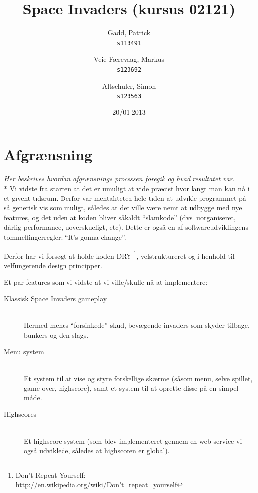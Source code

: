 \documentclass[titlepage,danish]{article}
\begin{document}
\title{Space Invaders (kursus 02121)}
\date{20/01-2013}
\author{
  Gadd, Patrick\\
  \texttt{s113491}
  \and
  Veie Færevaag, Markus\\
  \texttt{s123692}
  \and
  Altschuler, Simon\\
  \texttt{s123563}
}
\maketitle

\section{Afgrænsning}
\emph{Her beskrives hvordan afgrænsnings processen foregik og hvad resultatet var.}\\*
Vi vidste fra starten at det er umuligt at vide præcist hvor langt man kan nå i et givent
tidsrum. Derfor var mentaliteten hele tiden at udvikle programmet på så generisk vis som muligt,
således at det ville være nemt at udbygge med nye features, og det uden at koden bliver såkaldt
``slamkode'' (dvs. uorganiseret, dårlig performance, uoverskueligt, etc). Dette er også en af
softwareudviklingens tommelfingerregler: ``It's gonna change''.

Derfor har vi forsøgt at holde koden DRY \footnote{Don't Repeat Yourself:
  \url{http://en.wikipedia.org/wiki/Don't_repeat_yourself}}, velstruktureret og i henhold til velfungerende design principper.

Et par features som vi vidste at vi ville/skulle nå at implementere:
\begin{description}
  \item[Klassisk Space Invaders gameplay] \hfill \\
    Hermed menes ``forsinkede'' skud, bevægende invaders som skyder tilbage, bunkers og den slags.

  \item[Menu system] \hfill \\
    Et system til at vise og styre forskellige skærme (såsom menu, selve spillet, game over,
    highscore), samt et system til at oprette disse på en simpel måde.

  \item[Highscores] \hfill \\
    Et highscore system (som blev implementeret gennem en web service vi også udviklede, således at
    highscoren er global).

\end{description}
\end{document}
